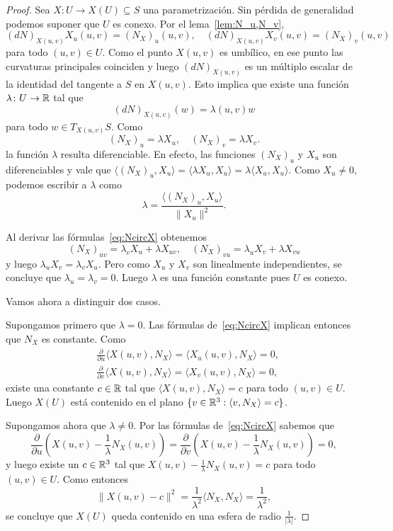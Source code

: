 \begin{proof}
	Sea $X\colon U\to X(U)\subseteq S$ una parametrización. Sin pérdida de
	generalidad podemos suponer que $U$ es conexo.  Por el
	lema~\ref{lem:N_u,N_v}, 
	\[
		(dN)_{X(u,v)}X_u(u,v)=(N_X)_u(u,v),\quad
		(dN)_{X(u,v)}X_v(u,v)=(N_X)_v(u,v)
	\]
	para todo $(u,v)\in U$. Como el punto $X(u,v)$ es umbílico, en ese punto
	las curvaturas principales coinciden y luego $(dN)_{X(u,v)}$ es un múltiplo
	escalar de la identidad del tangente a $S$ en $X(u,v)$. Esto implica que
	existe una función $\lambda\colon U\to\mathbb{R}$ tal que 
	\[
		(dN)_{X(u,v)}(w)=\lambda(u,v)w
	\]
	para todo $w\in T_{X(u,v)}S$. Como 
	\begin{equation}
		\label{eq:NcircX}
		(N_X)_u=\lambda X_u,\quad
		(N_X)_v=\lambda X_v.
	\end{equation}
	la función $\lambda$ resulta diferenciable. En efecto, las funciones
	$(N_X)_u$ y $X_u$ son diferenciables y vale que $\langle (N_X)_u,X_u\rangle=\langle \lambda X_u,X_u\rangle=\lambda\langle
	X_u,X_u\rangle$. Como $X_u\ne 0$, podemos escribir a $\lambda$ como 
	\[
		\lambda=\frac{\langle (N_X)_u,X_u\rangle}{\|X_u\|^2}.
	\]

	Al derivar las fórmulas~\eqref{eq:NcircX} obtenemos
	\[
		(N_X)_{uv}=\lambda_vX_u+\lambda X_{uv},\quad
		(N_X)_{vu}=\lambda_uX_v+\lambda X_{vu}
	\]
	y luego $\lambda_uX_v=\lambda_vX_u$. Pero como $X_u$ y $X_v$ son
	linealmente independientes, se concluye que $\lambda_u=\lambda_v=0$. Luego
	$\lambda$ es una función constante pues $U$ es conexo.

	Vamos ahora a distinguir dos casos. 
	
	Supongamos primero que $\lambda=0$. Las fórmulas de~\eqref{eq:NcircX}
	implican entonces que $N_X$ es constante. Como
	\begin{align*}
		&\frac{\partial}{\partial u}\langle X(u,v),N_X\rangle=\langle X_u(u,v),N_X\rangle=0,\\
		&\frac{\partial}{\partial v}\langle X(u,v),N_X\rangle=\langle X_v(u,v),N_X\rangle=0,
	\end{align*}
	existe una constante $c\in\mathbb{R}$ tal que $\langle X(u,v),N_X\rangle=c$ para todo
	$(u,v)\in U$. Luego $X(U)$ está contenido en el plano $\{v\in\mathbb{R}^3:\langle
	v,N_X\rangle=c\}$. 

	Supongamos ahora que $\lambda\ne0$. Por las fórmulas de~\eqref{eq:NcircX}
	sabemos que
	\[
		\frac{\partial}{\partial u}\left(X(u,v)-\frac{1}{\lambda}N_X(u,v)\right)=
		\frac{\partial}{\partial v}\left(X(u,v)-\frac{1}{\lambda}N_X(u,v)\right)=0,
	\]
	y luego existe un $c\in\mathbb{R}^3$ tal que $X(u,v)-\frac{1}{\lambda}N_X(u,v)=c$
	para todo $(u,v)\in U$.  Como entonces
	\[
		\|X(u,v)-c\|^2=\frac{1}{\lambda^2}\langle N_X,N_X\rangle=\frac{1}{\lambda^2},
	\]
	se concluye que $X(U)$ queda contenido en una esfera de radio
	$\frac{1}{|\lambda|}$.


\end{proof}
